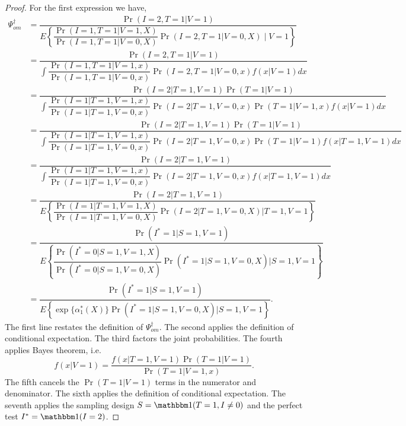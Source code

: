 \documentclass{article}
\begin{document}
\begin{proof}
For the first expression we have,
    \begin{align*}
    \Psi^\dagger_{om} &= \dfrac{\Pr(I=2, T = 1|V=1)}{E\left\{ \dfrac{\Pr(I = 1, T = 1 | V = 1, X)}{\Pr(I = 1, T = 1 | V = 0, X)}\Pr(I = 2, T = 1 | V = 0, X) \mid  V = 1\right\}} \\
    &= \dfrac{\Pr(I = 2, T = 1 | V = 1)}{\int \dfrac{\Pr(I = 1, T = 1 | V = 1, x)}{\Pr(I = 1, T = 1 | V = 0, x)} \Pr(I = 2, T = 1 | V = 0, x) f(x | V = 1) dx} \\
    &= \dfrac{\Pr(I = 2 | T = 1, V = 1)\Pr(T = 1 | V = 1)}{\int \dfrac{\Pr(I = 1 | T = 1, V = 1, x)}{\Pr(I = 1 | T = 1, V = 0, x)} \Pr(I = 2 | T = 1, V = 0, x) \Pr(T = 1 | V = 1, x) f(x | V = 1) dx} \\
    &= \dfrac{\Pr(I = 2 | T = 1, V = 1)\Pr(T = 1 | V = 1)}{\int \dfrac{\Pr(I = 1 | T = 1, V = 1, x)}{\Pr(I = 1 | T = 1, V = 0, x)} \Pr(I = 2 | T = 1, V = 0, x) \Pr(T = 1 | V = 1) f(x | T =1, V = 1) dx} \\
    &= \dfrac{\Pr(I = 2 | T = 1, V = 1)}{\int \dfrac{\Pr(I = 1 | T = 1, V = 1, x)}{\Pr(I = 1 | T = 1, V = 0, x)} \Pr(I = 2 | T = 1, V = 0, x) f(x | T =1, V = 1) dx} \\
    &= \dfrac{\Pr(I = 2 | T = 1, V = 1)}{E\left\{ \dfrac{\Pr(I = 1 | T = 1, V = 1, X)}{\Pr(I = 1 | T = 1, V = 0, X)} \Pr(I = 2 | T = 1, V = 0, X) \bigg| T = 1, V = 1\right\}} \\
    &= \dfrac{\Pr(I^* = 1 | S = 1, V = 1)}{E\left\{ \dfrac{\Pr(I^* = 0 | S = 1, V = 1, X)}{\Pr(I^* = 0 | S = 1, V = 0, X)} \Pr(I^* = 1 | S = 1, V = 0, X) \bigg| S = 1, V = 1\right\}} \\
    &= \dfrac{\Pr(I^* = 1 | S = 1, V = 1)}{E\left\{ \exp\{\alpha^*_1(X)\} \Pr(I^* = 1 | S = 1, V = 0, X) \Big| S = 1, V = 1 \right\}}.
\end{align*}
The first line restates the definition of $\Psi^\dagger_{om}$. The second applies the definition of conditional expectation. The third factors the joint probabilities. The fourth applies Bayes theorem, i.e. 
\begin{equation*}
    f(x | V = 1) = \dfrac{f(x | T = 1, V = 1)\Pr(T = 1 | V = 1)}{\Pr(T = 1 | V = 1, x)}.
\end{equation*}
The fifth cancels the $\Pr(T = 1 |V = 1)$ terms in the numerator and denominator. The sixth applies the definition of conditional expectation. The seventh applies the sampling design $S = \mathbbm 1 (T = 1, I \neq 0)$ and the perfect test $I^* = \mathbbm 1(I = 2)$.


\end{proof}
\end{document}
